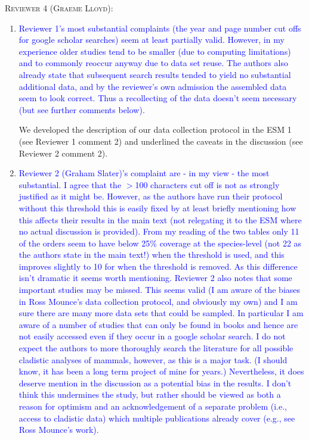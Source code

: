 \documentclass[12pt,letterpaper]{article}
\renewcommand{\section}[1]{%
\bigskip
\begin{center}
\begin{Large}
\normalfont\scshape #1
\medskip
\end{Large}
\end{center}}
\begin{document}

\section{Reviewer 4 (Graeme Lloyd):}
\begin{enumerate}
\item{\textcolor{blue}{Reviewer 1's most substantial complaints (the year and page number cut offs for google scholar searches) seem at least partially valid.
However, in my experience older studies tend to be smaller (due to computing limitations) and to commonly reoccur anyway due to data set reuse.
The authors also already state that subsequent search results tended to yield no substantial additional data, and by the reviewer's own admission the assembled data seem to look correct.
Thus a recollecting of the data doesn't seem necessary (but see further comments below).}}

We developed the description of our data collection protocol in the ESM 1 (see Reviewer 1 comment 2) and underlined the caveats in the discussion (see Reviewer 2 comment 2).

\item{\textcolor{blue}{Reviewer 2 (Graham Slater)'s complaint are - in my view - the most substantial.
I agree that the $>$100 characters cut off is not as strongly justified as it might be.
However, as the authors have run their protocol without this threshold this is easily fixed by at least briefly mentioning how this affects their results in the main text (not relegating it to the ESM where no actual discussion is provided).
From my reading of the two tables only 11 of the orders seem to have below 25\% coverage at the species-level (not 22 as the authors state in the main text!) when the threshold is used, and this improves slightly to 10 for when the threshold is removed.
As this difference isn't dramatic it seems worth mentioning.
Reviewer 2 also notes that some important studies may be missed.
This seems valid (I am aware of the biases in Ross Mounce's data collection protocol, and obviously my own) and I am sure there are many more data sets that could be sampled.
In particular I am aware of a number of studies that can only be found in books and hence are not easily accessed even if they occur in a google scholar search.
I do not expect the authors to more thoroughly search the literature for all possible cladistic analyses of mammals, however, as this is a major task.
(I should know, it has been a long term project of mine for years.)
Nevertheless, it does deserve mention in the discussion as a potential bias in the results.
I don't think this undermines the study, but rather should be viewed as both a reason for optimism and an acknowledgement of a separate problem (i.e., access to cladistic data) which multiple publications already cover (e.g., see Ross Mounce's work).}}


\end{enumerate}
\end{document}
